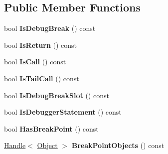 \subsection*{Public Member Functions}
\begin{DoxyCompactItemize}
\item 
bool {\bfseries Is\+Debug\+Break} () const \hypertarget{classv8_1_1internal_1_1_break_location_a5ebaa2d0985611bd27be3250bb9ea54c}{}\label{classv8_1_1internal_1_1_break_location_a5ebaa2d0985611bd27be3250bb9ea54c}

\item 
bool {\bfseries Is\+Return} () const \hypertarget{classv8_1_1internal_1_1_break_location_ad1f966cd44f918908643aaaf73393d32}{}\label{classv8_1_1internal_1_1_break_location_ad1f966cd44f918908643aaaf73393d32}

\item 
bool {\bfseries Is\+Call} () const \hypertarget{classv8_1_1internal_1_1_break_location_ae844ffa1e9b62cc4a2d4fbc69a53e8d9}{}\label{classv8_1_1internal_1_1_break_location_ae844ffa1e9b62cc4a2d4fbc69a53e8d9}

\item 
bool {\bfseries Is\+Tail\+Call} () const \hypertarget{classv8_1_1internal_1_1_break_location_af003382df26856afc0ad2676f2cd1280}{}\label{classv8_1_1internal_1_1_break_location_af003382df26856afc0ad2676f2cd1280}

\item 
bool {\bfseries Is\+Debug\+Break\+Slot} () const \hypertarget{classv8_1_1internal_1_1_break_location_a6bbf62a35b09ede68cc68af949aa202d}{}\label{classv8_1_1internal_1_1_break_location_a6bbf62a35b09ede68cc68af949aa202d}

\item 
bool {\bfseries Is\+Debugger\+Statement} () const \hypertarget{classv8_1_1internal_1_1_break_location_a619a3b2c2f5537aa889a8b2b414c108a}{}\label{classv8_1_1internal_1_1_break_location_a619a3b2c2f5537aa889a8b2b414c108a}

\item 
bool {\bfseries Has\+Break\+Point} () const \hypertarget{classv8_1_1internal_1_1_break_location_a4049d40f3755e5203735ff014006e51a}{}\label{classv8_1_1internal_1_1_break_location_a4049d40f3755e5203735ff014006e51a}

\item 
\hyperlink{classv8_1_1internal_1_1_handle}{Handle}$<$ \hyperlink{classv8_1_1internal_1_1_object}{Object} $>$ {\bfseries Break\+Point\+Objects} () const \hypertarget{classv8_1_1internal_1_1_break_location_ae7097ed56b7644fba96876db1d3a143a}{}\label{classv8_1_1internal_1_1_break_location_ae7097ed56b7644fba96876db1d3a143a}


\end{DoxyCompactItemize}
